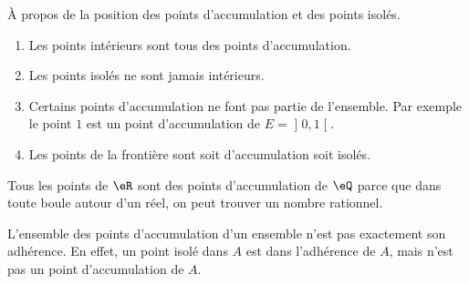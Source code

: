 \begin{remark}
    À propos de la position des points d'accumulation et des points isolés.
    \begin{enumerate}
        \item
            Les points intérieurs sont tous des points d'accumulation.
        \item
            Les points isolés ne sont jamais intérieurs.
        \item
            Certains points d'accumulation ne font pas partie de l'ensemble. Par exemple le point $1$ est un point d'accumulation de $E=\mathopen] 0 , 1 \mathclose[$.
        \item
            Les points de la frontière sont soit d'accumulation soit isolés.
    \end{enumerate}
\end{remark}


\begin{example}
	Tous les points de $\eR$ sont des points d'accumulation de $\eQ$ parce que dans toute boule autour d'un réel, on peut trouver un nombre rationnel.
\end{example}

\begin{remark}
	L'ensemble des points d'accumulation d'un ensemble n'est pas exactement son adhérence. En effet, un point isolé dans $A$ est dans l'adhérence de $A$, mais n'est pas un point d'accumulation de $A$.
\end{remark}
